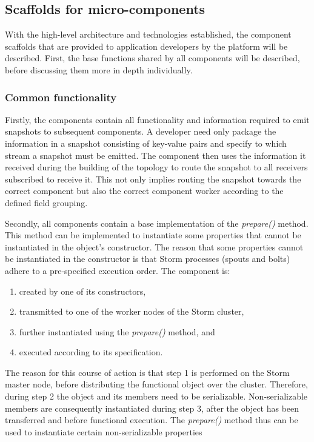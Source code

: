 \subsection{Scaffolds for micro-components}
With the high-level architecture and technologies established, the component scaffolds that are provided to application developers by the platform will be described. First, the base functions shared by all components will be described, before discussing them more in depth individually.

\subsubsection*{Common functionality}
Firstly, the components contain all functionality and information required to emit snapshots to subsequent components. A developer need only package the information in a snapshot consisting of key-value pairs and specify to which stream a snapshot must be emitted. The component then uses the information it received during the building of the topology to route the snapshot to all receivers subscribed to receive it. This not only implies routing the snapshot towards the correct component but also the correct component worker according to the defined field grouping.

Secondly, all components contain a base implementation of the \emph{prepare()} method. This method can be implemented to instantiate some properties that cannot be instantiated in the object's constructor. The reason that some properties cannot be instantiated in the constructor is that Storm processes (spouts and bolts) adhere to a pre-specified execution order. The component is:
\begin{enumerate}
\nospace
\item created by one of its constructors,
\item transmitted to one of the worker nodes of the Storm cluster,
\item further instantiated using the \emph{prepare()} method, and
\item executed according to its specification.
\end{enumerate}
The reason for this course of action is that step 1 is performed on the Storm master node, before distributing the functional object over the cluster. Therefore, during step 2 the object and its members need to be serializable. Non-serializable members are consequently instantiated during step 3, after the object has been transferred and before functional execution. The \emph{prepare()} method thus can be used to instantiate certain non-serializable properties

